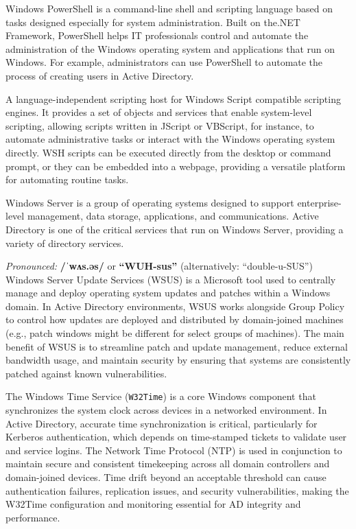  Windows PowerShell is a command-line shell and scripting language based on tasks designed especially for system administration. Built on the.NET Framework, PowerShell helps IT professionals control and automate the administration of the Windows operating system and applications that run on Windows. For example, administrators can use PowerShell to automate the process of creating users in Active Directory.

 A language-independent scripting host for Windows Script compatible scripting engines. It provides a set of objects and services that enable system-level scripting, allowing scripts written in JScript or VBScript, for instance, to automate administrative tasks or interact with the Windows operating system directly. WSH scripts can be executed directly from the desktop or command prompt, or they can be embedded into a webpage, providing a versatile platform for automating routine tasks.

 Windows Server is a group of operating systems designed to support enterprise-level management, data storage, applications, and communications. Active Directory is one of the critical services that run on Windows Server, providing a variety of directory services.

\textit{Pronounced:} \textbf{/ˈwʌs.əs/} or \textbf{“WUH-sus”} (alternatively: “double-u-SUS”)
Windows Server Update Services (WSUS) is a Microsoft tool used to centrally manage and deploy operating system updates and patches within a Windows domain. In Active Directory environments, WSUS works alongside Group Policy to control how updates are deployed and distributed by domain-joined machines (e.g., patch windows might be different for select groups of machines). The main benefit of WSUS is to streamline patch and update management, reduce external bandwidth usage, and maintain security by ensuring that systems are consistently patched against known vulnerabilities.

 The Windows Time Service (\texttt{W32Time}) is a core Windows component that synchronizes the system clock across devices in a networked environment. In Active Directory, accurate time synchronization is critical, particularly for Kerberos authentication, which depends on time-stamped tickets to validate user and service logins. The Network Time Protocol (NTP) is used in conjunction to maintain secure and consistent timekeeping across all domain controllers and domain-joined devices. Time drift beyond an acceptable threshold can cause authentication failures, replication issues, and security vulnerabilities, making the W32Time configuration and monitoring essential for AD integrity and performance.


